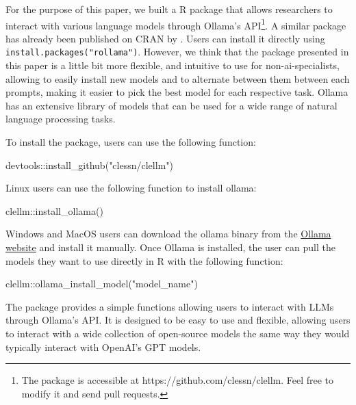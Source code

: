 \documentclass[
  authoryear,
  preprint,
  3p]{elsarticle}
\newenvironment{Shaded}{\begin{snugshade}}{\end{snugshade}}
\newcommand{\FunctionTok}[1]{\textcolor[rgb]{0.28,0.35,0.67}{#1}}
\newcommand{\NormalTok}[1]{\textcolor[rgb]{0.00,0.23,0.31}{#1}}
\newcommand{\SpecialCharTok}[1]{\textcolor[rgb]{0.37,0.37,0.37}{#1}}
\newcommand{\StringTok}[1]{\textcolor[rgb]{0.13,0.47,0.30}{#1}}
\begin{document}
For the purpose of this paper, we built a R package that allows
researchers to interact with various language models through Ollama's
API\footnote{The package is accessible at
  https://github.com/clessn/clellm. Feel free to modify it and send pull
  requests.}. A similar package has already been published on CRAN by
\citet{gruber_weber24}. Users can install it directly using
\texttt{install.packages("rollama")}. However, we think that the package
presented in this paper is a little bit more flexible, and intuitive to
use for non-ai-specialists, allowing to easily install new models and to
alternate between them between each prompts, making it easier to pick
the best model for each respective task. Ollama has an extensive library
of models that can be used for a wide range of natural language
processing tasks.

To install the package, users can use the following function:

\begin{Shaded}
\begin{Highlighting}[]
\NormalTok{devtools}\SpecialCharTok{::}\FunctionTok{install\_github}\NormalTok{(}\StringTok{"clessn/clellm"}\NormalTok{)}
\end{Highlighting}
\end{Shaded}

Linux users can use the following function to install ollama:

\begin{Shaded}
\begin{Highlighting}[]
\NormalTok{clellm}\SpecialCharTok{::}\FunctionTok{install\_ollama}\NormalTok{()}
\end{Highlighting}
\end{Shaded}

Windows and MacOS users can download the ollama binary from the
\href{https://ollama.com/}{Ollama website} and install it manually. Once
Ollama is installed, the user can pull the models they want to use
directly in R with the following function:

\begin{Shaded}
\begin{Highlighting}[]
\NormalTok{clellm}\SpecialCharTok{::}\FunctionTok{ollama\_install\_model}\NormalTok{(}\StringTok{"model\_name"}\NormalTok{)}
\end{Highlighting}
\end{Shaded}

The package provides a simple functions allowing users to interact with
LLMs through Ollama's API. It is designed to be easy to use and
flexible, allowing users to interact with a wide collection of
open-source models the same way they would typically interact with
OpenAI's GPT models.
\end{document}
